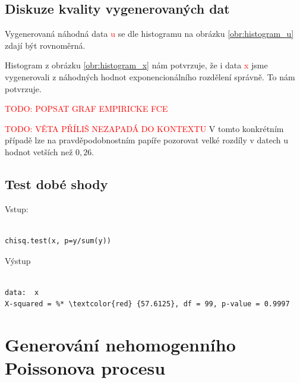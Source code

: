 \documentclass[12pt]{article}
\begin{document}
\subsection{Diskuze kvality vygenerovaných dat}
\begin{footnotesize}
\color{black}
Vygenerovaná náhodná data \textcolor{red}{u} se dle histogramu na obrázku \ref{obr:histogram_u} zdají být rovnoměrná.

Histogram z obrázku \ref{obr:histogram_x} nám potvrzuje, že i data \textcolor{red}{x} jsme vygenerovali z náhodných hodnot exponencionálního
rozdělení správně. To nám potvrzuje.

\textcolor{red}{TODO: POPSAT GRAF EMPIRICKE FCE}

\textcolor{red}{TODO: VĚTA PŘÍLIŠ NEZAPADÁ DO KONTEXTU}
V tomto konkrétním případě lze na pravděpodobnostním papíře pozorovat velké rozdíly v datech u hodnot vetších než $0,26$.
\end{footnotesize}

\subsection{Test dobé shody}
Vstup:
 \begin{lstlisting}[frame=single]  % Start your code-block
  
chisq.test(x, p=y/sum(y)) 
\end{lstlisting}
Výstup
 \begin{lstlisting}[frame=single]  % Start your code-block
  
data:  x
X-squared = %* \textcolor{red} {57.6125}, df = 99, p-value = 0.9997
\end{lstlisting}

\section{Generování nehomogenního Poissonova procesu}
\end{document}
